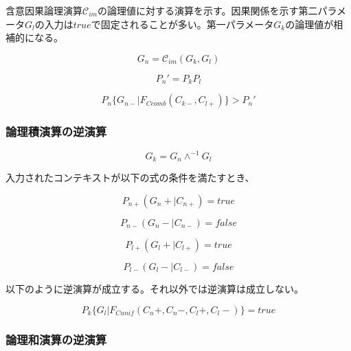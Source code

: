 \documentclass[12pt]{article}
\begin{document}
含意因果論理演算\(\mathcal{C}_{im}\)の論理値に対する演算を示す。因果関係を示す第二パラメータ\(G_l\)の入力は\(true\)で固定されることが多い。第一パラメータ\(G_k\)の論理値が相補的になる。

\begin{equation} G_n =\mathcal{C}_{im}(G_k , G_l)\end{equation}

\begin{equation} P_{n}'=P_{k}P_{l}\end{equation}

\begin{equation} P_{n}\{G_{n-}|F_{Ccomb}(C_{k-},C_{l+})\} > P_{n}'\end{equation}

\subsubsection{論理積演算の逆演算}\label{ux8ad6ux7406ux7a4dux6f14ux7b97ux306eux9006ux6f14ux7b97}

\begin{equation} G_k = G_n \wedge^{-1} G_l\end{equation}

入力されたコンテキストが以下の式の条件を満たすとき、

\begin{equation} P_{n+}(G_n+|C_{n+})=true\end{equation}

\begin{equation} P_{n-}(G_n-|C_{n-})= false \end{equation}

\begin{equation} P_{l+}(G_l+|C_{l+})=true \end{equation}

\begin{equation} P_{l-}(G_l-|C_{l-})  =false \end{equation}

以下のように逆演算が成立する。それ以外では逆演算は成立しない。

\begin{equation} P_k\{G_l|F_{Cunif}(C_n+,C_n-,C_l+,C_l-)\}=true\end{equation}

\subsubsection{論理和演算の逆演算}\label{ux8ad6ux7406ux548cux6f14ux7b97ux306eux9006ux6f14ux7b97}
\end{document}
